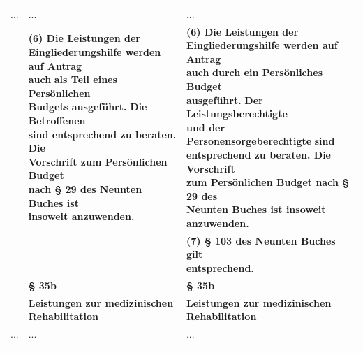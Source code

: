 \documentclass[10pt,a4paper,landscape]{article}
\begin{document}
\begin{longtable}{|L{8.2cm}|L{8.2cm}|L{8.2cm}|}
\hhline{|---|}
... & ... & ... \\
\hhline{|---|}
 & \textbf{(6) Die Leistungen der  \newline Eingliederungshilfe werden auf Antrag  \newline auch }\textbf{\textcolor{diffred}{als Teil eines Persönlichen  \newline Budgets}}\textbf{ ausgeführt. }\textbf{\textcolor{diffred}{Die Betroffenen}}\textbf{  \newline sind entsprechend zu beraten. Die  \newline Vorschrift zum Persönlichen Budget  \newline nach \S{} 29 des Neunten Buches ist  \newline insoweit anzuwenden. } & \textbf{(6) Die Leistungen der  \newline Eingliederungshilfe werden auf Antrag  \newline auch }\textbf{\textcolor{diffgreen}{durch ein Persönliches Budget}}\textbf{  \newline ausgeführt. }\textbf{\textcolor{diffgreen}{Der Leistungsberechtigte  \newline und der Personensorgeberechtigte}}\textbf{ sind  \newline entsprechend zu beraten. Die Vorschrift  \newline zum Persönlichen Budget nach \S{} 29 des  \newline Neunten Buches ist insoweit  \newline anzuwenden.  } \\
\hhline{|---|}
 &  & \textbf{\textcolor{diffgreen}{(7) \S{} 103 des Neunten Buches gilt  \newline entsprechend.}} \\
\hhline{|---|}
 & \textbf{\S{} 35b } & \textbf{\S{} 35b } \\
\hhline{|---|}
 & \textbf{Leistungen zur medizinischen  \newline Rehabilitation} & \textbf{Leistungen zur medizinischen  \newline Rehabilitation} \\
\hhline{|---|}
... & ... & ... \\
\hhline{|---|}

\end{longtable}
\end{document}
